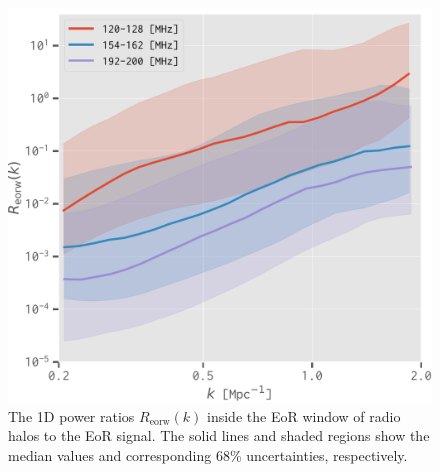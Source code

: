 \documentclass[twocolumn]{aastex62}
\newcommand{\R}[1]{\mathrm{#1}}
\begin{document}
\begin{figure}
  \centering
  \includegraphics[width=\columnwidth]{ps1d-ratio-3bands}
  \caption{\label{fig:ps1d-ratio}%
    The 1D power ratios $R_{\R{eorw}}(k)$ inside the EoR window of
    radio halos to the EoR signal.
    The solid lines and shaded regions show the median values and
    corresponding 68\% uncertainties, respectively.
  }
\end{figure}
\end{document}

